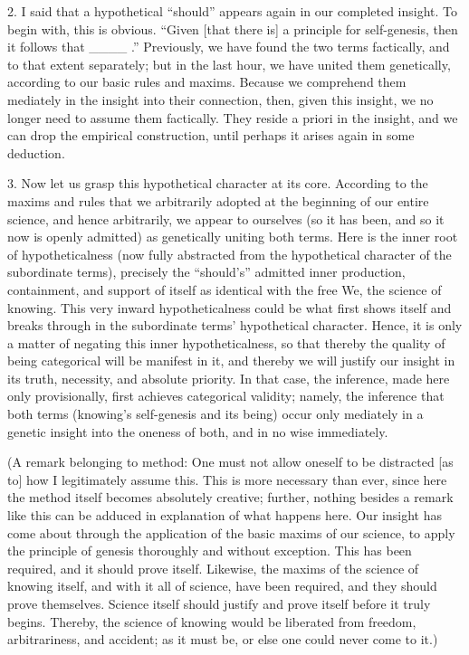 2. I said that a hypothetical “should” appears
again in our completed insight.
To begin with, this is obvious.
“Given [that there is] a principle
for self-genesis, then it follows that ____ .”
Previously, we have found the two terms factically,
and to that extent separately;
but in the last hour, we have united them genetically,
according to our basic rules and maxims.
Because we comprehend them mediately
in the insight into their connection,
then, given this insight,
we no longer need to assume them factically.
They reside a priori in the insight,
and we can drop the empirical construction,
until perhaps it arises again in some deduction.

3. Now let us grasp this hypothetical character at its core.
According to the maxims and rules that we arbitrarily adopted
at the beginning of our entire science, and hence arbitrarily,
we appear to ourselves
(so it has been, and so it now is openly admitted)
as genetically uniting both terms.
Here is the inner root of hypotheticalness
(now fully abstracted from the hypothetical
character of the subordinate terms),
precisely the “should’s” admitted
inner production, containment, and support of itself
as identical with the free We, the science of knowing.
This very inward hypotheticalness could be
what first shows itself and breaks through
in the subordinate terms’ hypothetical character.
Hence, it is only a matter of
negating this inner hypotheticalness,
so that thereby the quality of being categorical
will be manifest in it,
and thereby we will justify our insight
in its truth, necessity, and absolute priority.
In that case, the inference,
made here only provisionally,
first achieves categorical validity;
namely, the inference that both terms
(knowing’s self-genesis and its being)
occur only mediately in a genetic insight
into the oneness of both,
and in no wise immediately.

(A remark belonging to method:
One must not allow oneself to be distracted
[as to] how I legitimately assume this.
This is more necessary than ever,
since here the method itself becomes absolutely creative;
further, nothing besides a remark like this
can be adduced in explanation of what happens here.
Our insight has come about through
the application of the basic maxims of our science,
to apply the principle of genesis
thoroughly and without exception.
This has been required,
and it should prove itself.
Likewise, the maxims of the science of knowing itself,
and with it all of science, have been required,
and they should prove themselves.
Science itself should justify
and prove itself before it truly begins.
Thereby, the science of knowing would be liberated
from freedom, arbitrariness, and accident;
as it must be, or else one could never come to it.)

